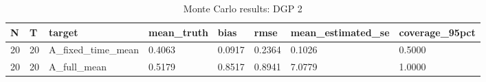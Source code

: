 \begin{table}[!htbp]
\centering
\caption{Monte Carlo results: DGP 2}
\label{tab:mc-dgp2}
\begin{tabular}{llllllll}
\toprule
N & T & target & mean\_truth & bias & rmse & mean\_estimated\_se & coverage\_95pct \\
\midrule
20 & 20 & A\_fixed\_time\_mean & 0.4063 & 0.0917 & 0.2364 & 0.1026 & 0.5000 \\
20 & 20 & A\_full\_mean & 0.5179 & 0.8517 & 0.8941 & 7.0779 & 1.0000 \\
\bottomrule
\end{tabular}
\end{table}
